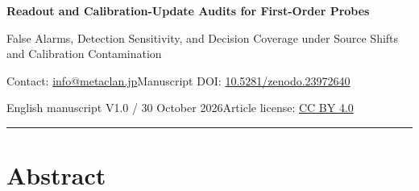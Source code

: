 \documentclass[10pt,a4paper]{article}
\begin{document}
\fontsize{10.7}{15.3}\selectfont\thispagestyle{first}

{\raggedright\sffamily\bfseries\color{ink}\fontsize{22}{27}\selectfont Readout and Calibration-Update Audits for First-Order Probes\par}

{\raggedright\sffamily\fontsize{13}{17}\selectfont\color{accent} False Alarms, Detection Sensitivity, and Decision Coverage under Source Shifts and Calibration Contamination\par}

\par
{\small Contact: \href{mailto:info@metaclan.jp}{info@metaclan.jp}\quad\textbar\quad Manuscript DOI: \href{https://doi.org/10.5281/zenodo.23972640}{10.5281/zenodo.23972640}\par}

{\small English manuscript V1.0 / 30 October 2026\quad\textbar\quad Article license: \href{https://creativecommons.org/licenses/by/4.0/}{CC BY 4.0}\par}\smallskip\hrule\medskip

\section{Abstract}
\end{document}
